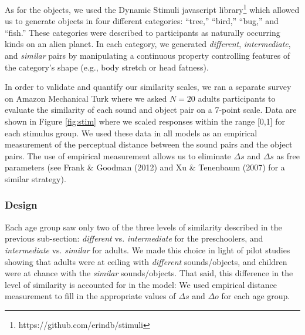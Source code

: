 \documentclass[english,,man]{apa6}
\let\rmarkdownfootnote\footnote%
\def\footnote{\protect\rmarkdownfootnote}
\begin{document}
As for the objects, we used the Dynamic Stimuli javascript library\footnote{https://github.com/erindb/stimuli} which allowed us to generate objects in four different categories: \enquote{tree,} \enquote{bird,} \enquote{bug,} and \enquote{fish.} These categories were described to participants as naturally occurring kinds on an alien planet. In each category, we generated \emph{different}, \emph{intermediate}, and \emph{similar} pairs by manipulating a continuous property controlling features of the category's shape (e.g., body stretch or head fatness).

In order to validate and quantify our similarity scales, we ran a separate survey on Amazon Mechanical Turk where we asked \(N=20\) adults participants to evaluate the similarity of each sound and object pair on a 7-point scale. Data are shown in Figure \ref{fig:stim} where we scaled responses within the range {[}0,1{]} for each stimulus group. We used these data in all models as an empirical measurement of the perceptual distance between the sound pairs and the object pairs. The use of empirical measurement allows us to eliminate \(\Delta s\) and \(\Delta s\) as free parameters (see Frank \& Goodman (2012) and Xu \& Tenenbaum (2007) for a similar strategy).

\hypertarget{design}{%
\subsubsection{Design}\label{design}}

Each age group saw only two of the three levels of similarity described in the previous sub-section: \emph{different} vs. \emph{intermediate} for the preschoolers, and \emph{intermediate} vs. \emph{similar} for adults. We made this choice in light of pilot studies showing that adults were at ceiling with \emph{different} sounds/objects, and children were at chance with the \emph{similar} sounds/objects. That said, this difference in the level of similarity is accounted for in the model: We used empirical distance measurement to fill in the appropriate values of \(\Delta s\) and \(\Delta o\) for each age group.
\end{document}
